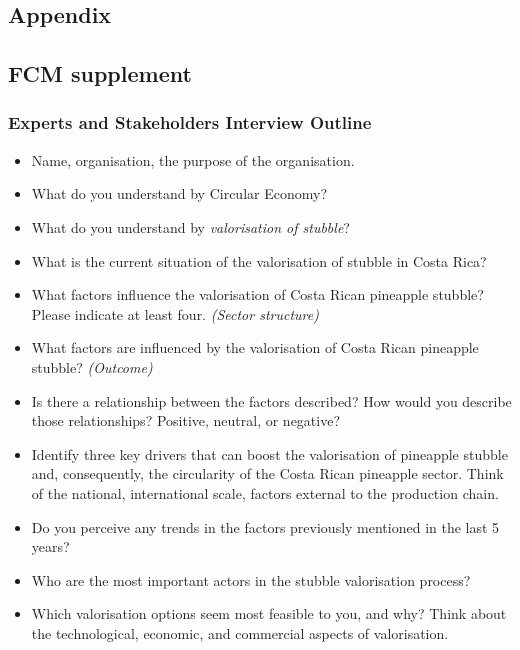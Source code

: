 
\renewcommand{\thesection}{A\arabic{section}}
\renewcommand\thefigure{A\arabic{section}.\arabic{figure}}  
\renewcommand\thetable{A\arabic{section}.\arabic{table}}  

\begin{appendices}

\chapter*{Appendix}

\section{FCM supplement}

\subsection{Experts and Stakeholders Interview Outline}
\label{interviewOutline}

\begin{itemize}

\item Name, organisation, the purpose of the organisation.
\item What do you understand by Circular Economy?
\item What do you understand by \textit{valorisation of stubble}?
\item What is the current situation of the valorisation of stubble in Costa Rica?
\item What factors influence the valorisation of Costa Rican pineapple stubble? Please indicate at least four. \textit{(Sector structure)}
\item What factors are influenced by the valorisation of Costa Rican pineapple stubble? \textit{(Outcome)}
\item Is there a relationship between the factors described? How would you describe those relationships? Positive, neutral, or negative?
\item Identify three key drivers that can boost the valorisation of pineapple stubble and, consequently, the circularity of the Costa Rican pineapple sector. Think of the national, international scale, factors external to the production chain.
\item Do you perceive any trends in the factors previously mentioned in the last 5 years?
\item Who are the most important actors in the stubble valorisation process?
\item Which valorisation options seem most feasible to you, and why? Think about the technological, economic, and commercial aspects of valorisation.


\end{itemize}
\end{appendices}
